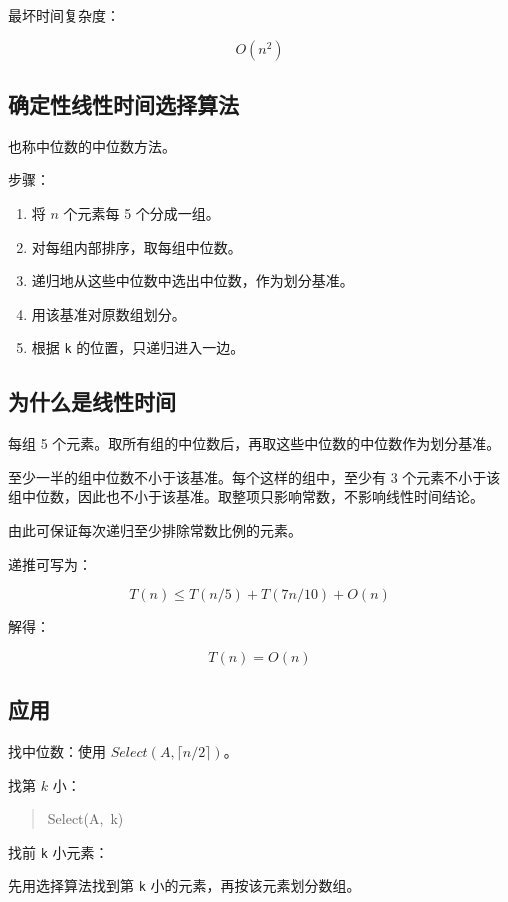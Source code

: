 \documentclass[UTF8,zihao=-4]{ctexart}
\begin{document}
最坏时间复杂度：

\[O(n^{2})\]

\subsection*{确定性线性时间选择算法}

也称中位数的中位数方法。

步骤：

\begin{enumerate}
\item 将 $n$ 个元素每 5 个分成一组。
\item 对每组内部排序，取每组中位数。
\item 递归地从这些中位数中选出中位数，作为划分基准。
\item 用该基准对原数组划分。
\item 根据 \texttt{k} 的位置，只递归进入一边。
\end{enumerate}

\subsection*{为什么是线性时间}

每组 5 个元素。取所有组的中位数后，再取这些中位数的中位数作为划分基准。

至少一半的组中位数不小于该基准。每个这样的组中，至少有 3 个元素不小于该组中位数，因此也不小于该基准。取整项只影响常数，不影响线性时间结论。

由此可保证每次递归至少排除常数比例的元素。

递推可写为：

\[T(n) \le  T(n/5) + T(7n/10) + O(n)\]

解得：

\[T(n) = O(n)\]

\subsection*{应用}

找中位数：使用 $Select(A, \lceil n/2 \rceil)$。

找第 $k$ 小：

\begin{quote}
\small\ttfamily\raggedright
\relax Select(A,\ k)\\
\end{quote}

找前 \texttt{k} 小元素：

先用选择算法找到第 \texttt{k} 小的元素，再按该元素划分数组。
\end{document}
